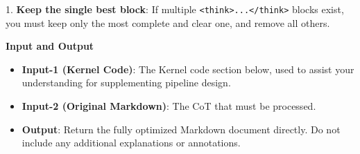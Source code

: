 \begin{table}[t]
\begin{tcolorbox}
{1. \textbf{Keep the single best block}: If multiple \texttt{<think>...</think>} blocks exist, you must keep only the most complete and clear one, and remove all others.

\textbf{Input and Output}
\begin{itemize}
\setlength{\itemsep}{0pt}
    \setlength{\parskip}{0pt}
    \setlength{\topsep}{0pt}
    \item \textbf{Input-1 (Kernel Code)}: The Kernel code section below, used to assist your understanding for supplementing pipeline design.
    \item \textbf{Input-2 (Original Markdown)}: The CoT that must be processed.
    \item \textbf{Output}: Return the fully optimized Markdown document directly. Do not include any additional explanations or annotations.
\end{itemize}
}
\end{tcolorbox}
\label{tab:optimization_prompt}
\end{table}
\clearpage